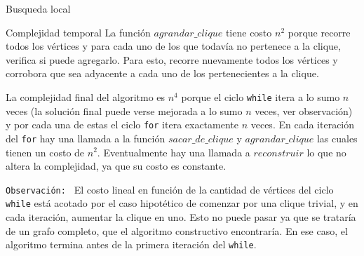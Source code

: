 \begin{section}{Busqueda local}
\begin{subsection}{Complejidad temporal}
			La función $agrandar\_clique$ tiene costo $n^2$ porque recorre todos los vértices y para cada uno de los que todavía no pertenece a la clique, verifica si puede agregarlo. Para esto, recorre nuevamente todos los vértices y corrobora que sea adyacente a cada uno de los pertenecientes a la clique.

			La complejidad final del algoritmo es $n^4$ porque el ciclo \texttt{while} itera a lo sumo $n$ veces (la solución final puede verse mejorada a lo sumo $n$ veces, ver observación) y por cada una de estas el ciclo \texttt{for} itera exactamente $n$ veces. En cada iteración del \texttt{for} hay una llamada a la función $sacar\_de\_clique$ y $agrandar\_clique$ las cuales tienen un costo de $n^2$. Eventualmente hay una llamada a $reconstruir$ lo que no altera la complejidad, ya que su costo es constante.
			
			\texttt{Observación: } El costo lineal en función de la cantidad de vértices del ciclo \texttt{while} está acotado por el caso hipotético de comenzar por una clique trivial, y en cada iteración, aumentar la clique en uno. Esto no puede pasar ya que se trataría de un grafo completo, que el algoritmo constructivo encontraría. En ese caso, el algoritmo termina antes de la primera iteración del \texttt{while}.
		\end{subsection}
\end{section}



